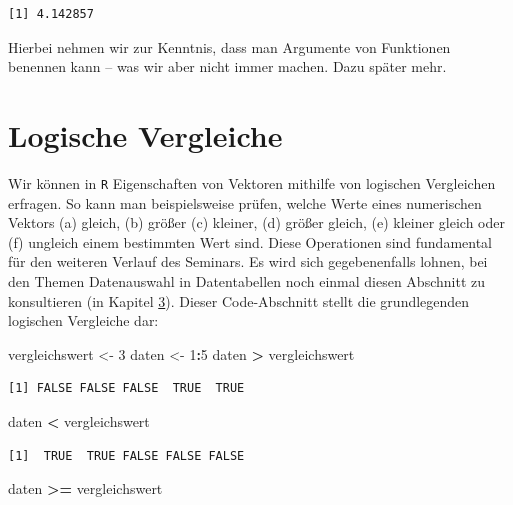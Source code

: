 \documentclass[12pt,]{tufte-book}
\newenvironment{Shaded}{\begin{snugshade}}{\end{snugshade}}
\newcommand{\DecValTok}[1]{\textcolor[rgb]{0.00,0.00,0.81}{#1}}
\newcommand{\StringTok}[1]{\textcolor[rgb]{0.31,0.60,0.02}{#1}}
\newcommand{\OperatorTok}[1]{\textcolor[rgb]{0.81,0.36,0.00}{\textbf{#1}}}
\newcommand{\NormalTok}[1]{#1}
\theoremstyle{definition}
\theoremstyle{definition}
\theoremstyle{definition}
\theoremstyle{remark}
\begin{document}
\begin{verbatim}
[1] 4.142857
\end{verbatim}

Hierbei nehmen wir zur Kenntnis, dass man Argumente von Funktionen
benennen kann -- was wir aber nicht immer machen. Dazu später mehr.

\section{Logische Vergleiche}\label{logische-vergleiche}

Wir können in \texttt{R} Eigenschaften von Vektoren mithilfe von
logischen Vergleichen erfragen. So kann man beispielsweise prüfen,
welche Werte eines numerischen Vektors (a) gleich, (b) größer (c)
kleiner, (d) größer gleich, (e) kleiner gleich oder (f) ungleich einem
bestimmten Wert sind. Diese Operationen sind fundamental für den
weiteren Verlauf des Seminars. Es wird sich gegebenenfalls lohnen, bei
den Themen Datenauswahl in Datentabellen noch einmal diesen Abschnitt zu
konsultieren (in Kapitel \protect\hyperlink{subset}{3}). Dieser
Code-Abschnitt stellt die grundlegenden logischen Vergleiche dar:

\begin{Shaded}
\begin{Highlighting}[]
\NormalTok{vergleichswert <-}\StringTok{ }\DecValTok{3}
\NormalTok{daten <-}\StringTok{ }\DecValTok{1}\OperatorTok{:}\DecValTok{5}
\NormalTok{daten }\OperatorTok{>}\StringTok{ }\NormalTok{vergleichswert}
\end{Highlighting}
\end{Shaded}

\begin{verbatim}
[1] FALSE FALSE FALSE  TRUE  TRUE
\end{verbatim}

\begin{Shaded}
\begin{Highlighting}[]
\NormalTok{daten }\OperatorTok{<}\StringTok{ }\NormalTok{vergleichswert}
\end{Highlighting}
\end{Shaded}

\begin{verbatim}
[1]  TRUE  TRUE FALSE FALSE FALSE
\end{verbatim}

\begin{Shaded}
\begin{Highlighting}[]
\NormalTok{daten }\OperatorTok{>=}\StringTok{ }\NormalTok{vergleichswert}
\end{Highlighting}
\end{Shaded}
\end{document}
